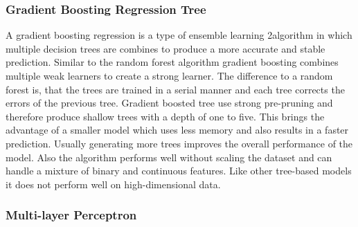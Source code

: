 

\subsubsection{Gradient Boosting Regression Tree}
A gradient boosting regression is a type of ensemble learning 2algorithm in
which multiple
decision trees are combines
to produce a more accurate and stable prediction. Similar to the random
forest algorithm gradient
boosting combines
multiple weak learners to create a strong learner.
The difference to a random forest is, that the trees are trained in a serial
manner and each tree
corrects the errors
of the previous tree. \cite[p. 88-89]{muller_introductionmachinelearning_2016}
Gradient boosted tree use strong pre-pruning and therefore produce shallow
trees with a depth of
one to five. This
brings the advantage of a smaller model which uses less memory and also
results in a faster
prediction.
Usually generating more trees improves the overall performance of the model.
\cite[p.
88-89]{muller_introductionmachinelearning_2016}
Also the algorithm performs well without scaling the dataset and can handle a
mixture of binary
and continuous
features. \cite[p. 88-89]{muller_introductionmachinelearning_2016}
Like other tree-based models it does not perform well on high-dimensional data.

\subsubsection{Multi-layer Perceptron}

